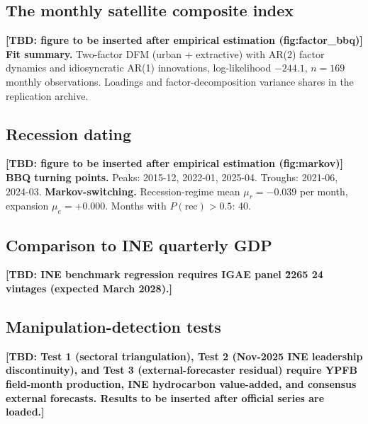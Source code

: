 \documentclass[11pt,letterpaper]{article}
\newcommand{\tbdline}[1]{\textcolor{yellow!60!black}{\textbf{[TBD: #1]}}}
\newcommand{\claim}[1]{\textbf{#1.}}
\begin{document}

\subsection{The monthly satellite composite index}
\label{subsec:composite}
\tbdline{figure to be inserted after empirical estimation (fig:factor_bbq)}
\claim{Fit summary} Two-factor DFM (urban + extractive) with AR(2) factor dynamics and idiosyncratic AR(1) innovations, log-likelihood $-244.1$, $n=169$ monthly observations. Loadings and factor-decomposition variance shares in the replication archive.



\subsection{Recession dating}
\label{subsec:dating}
\tbdline{figure to be inserted after empirical estimation (fig:markov)}
\claim{BBQ turning points} Peaks: 2015-12, 2022-01, 2025-04. Troughs: 2021-06, 2024-03.
\claim{Markov-switching} Recession-regime mean $\mu_r=-0.039$ per month, expansion $\mu_e=+0.000$. Months with $P(\mathrm{rec})>0.5$: 40.



\subsection{Comparison to INE quarterly GDP}
\label{subsec:ine_comparison}
\tbdline{INE benchmark regression requires IGAE panel \u2265 24 vintages (expected March 2028).}



\subsection{Manipulation-detection tests}
\label{subsec:manipulation}
\tbdline{Test 1 (sectoral triangulation), Test 2 (Nov-2025 INE leadership discontinuity), and Test 3 (external-forecaster residual) require YPFB field-month production, INE hydrocarbon value-added, and consensus external forecasts. Results to be inserted after official series are loaded.}


\end{document}
